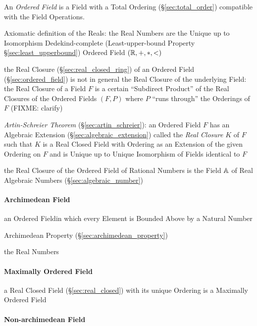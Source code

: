 An \emph{Ordered Field} is a Field with a Total Ordering
(\S\ref{sec:total_order}) compatible with the Field Operations.

Axiomatic definition of the Reals: the Real Numbers are the Unique up to
Isomorphism Dedekind-complete (Least-upper-bound Property
\S\ref{sec:least_upperbound}) Ordered Field $(\mathbb{R}, +, *, <)$

the Real Closure (\S\ref{sec:real_closed_ring}) of an Ordered Field
(\S\ref{sec:ordered_field}) is not in general the Real Closure of the
underlying Field: the Real Closure of a Field $F$ is a certain ``Subdirect
Product'' of the Real Closures of the Ordered Fields $(F,P)$ where $P$ ``runs
through'' the Orderings of $F$ (FIXME: clarify)

\emph{Artin-Schreier Theorem} (\S\ref{sec:artin_schreier}): an Ordered Field
$F$ has an Algebraic Extension (\S\ref{sec:algebraic_extension}) called the
\emph{Real Closure} $K$ of $F$ such that $K$ is a Real Closed Field with
Ordering as an Extension of the given Ordering on $F$ and is Unique up to
Unique Isomorphism of Fields identical to $F$

the Real Closure of the Ordered Field of Rational Numbers is the Field $\mathbb{A}$
of Real Algebraic Numbers (\S\ref{sec:algebraic_number})



\paragraph{Archimedean Field}\label{sec:archimedean_field}\hfill

an Ordered Fieldin which every Element is Bounded Above by a Natural Number

Archimedean Property (\S\ref{sec:archimedean_property})

the Real Numbers



\paragraph{Maximally Ordered Field}\label{sec:maximally_ordered_field}\hfill

a Real Closed Field (\S\ref{sec:real_closed}) with its unique Ordering is a
Maximally Ordered Field



\paragraph{Non-archimedean Field}\label{sec:nonarchimedean_field}\hfill


